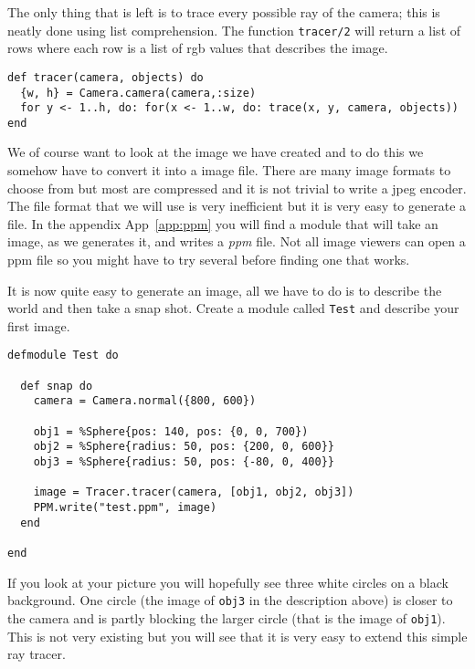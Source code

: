 \documentclass[a4paper,11pt]{article}
\begin{document}
The only thing that is left is to trace every possible ray of the
camera; this is neatly done using list comprehension. The function
{\tt tracer/2} will return a list of rows where each row is a list of
rgb values that describes the image.

\begin{verbatim}
def tracer(camera, objects) do
  {w, h} = Camera.camera(camera,:size)
  for y <- 1..h, do: for(x <- 1..w, do: trace(x, y, camera, objects))
end
\end{verbatim}

We of course want to look at the image we have created and to do this
we somehow have to convert it into a image file. There are many image
formats to choose from but most are compressed and it is not trivial
to write a jpeg encoder. The file format that we will use is very
inefficient but it is very easy to generate a file. In the appendix
App~\ref{app:ppm} you will find a module that will take an image, as we
generates it, and writes a {\em ppm} file. Not all image viewers can
open a ppm file so you might have to try several before finding one that works.

It is now quite easy to generate an image, all we have to do is to
describe the world and then take a snap shot. Create a module called
{\tt Test} and describe your first image.

\pagebreak

\begin{verbatim}
defmodule Test do

  def snap do
    camera = Camera.normal({800, 600})

    obj1 = %Sphere{pos: 140, pos: {0, 0, 700})
    obj2 = %Sphere{radius: 50, pos: {200, 0, 600}}
    obj3 = %Sphere{radius: 50, pos: {-80, 0, 400}}

    image = Tracer.tracer(camera, [obj1, obj2, obj3])
    PPM.write("test.ppm", image)
  end

end
\end{verbatim}

If you look at your picture you will hopefully see three white circles
on a black background. One circle (the image of {\tt obj3} in the
description above) is closer to the camera and is partly blocking the
larger circle (that is the image of {\tt obj1}). This is not very
existing but you will see that it is very easy to extend this simple
ray tracer.


\end{document}
